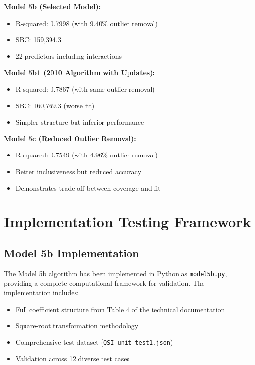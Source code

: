 \textbf{Model 5b (Selected Model):}
\begin{itemize}
    \item R-squared: 0.7998 (with 9.40\% outlier removal)
    \item SBC: 159,394.3
    \item 22 predictors including interactions
\end{itemize}

\textbf{Model 5b1 (2010 Algorithm with Updates):}
\begin{itemize}
    \item R-squared: 0.7867 (with same outlier removal)
    \item SBC: 160,769.3 (worse fit)
    \item Simpler structure but inferior performance
\end{itemize}

\textbf{Model 5c (Reduced Outlier Removal):}
\begin{itemize}
    \item R-squared: 0.7549 (with 4.96\% outlier removal)
    \item Better inclusiveness but reduced accuracy
    \item Demonstrates trade-off between coverage and fit
\end{itemize}

\section{Implementation Testing Framework}

\subsection{Model 5b Implementation}

The Model 5b algorithm has been implemented in Python as \texttt{model5b.py}, providing a complete computational framework for validation. The implementation includes:

\begin{itemize}
    \item Full coefficient structure from Table 4 of the technical documentation
    \item Square-root transformation methodology
    \item Comprehensive test dataset (\texttt{QSI-unit-test1.json})
    \item Validation across 12 diverse test cases
\end{itemize}

